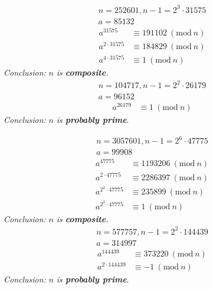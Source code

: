 \documentclass{article}
\newcommand{\Mod}[1]{\ (\mathrm{mod}\ #1)}
\begin{document}
\begin{multicols*}{2}
\begin{multicols*}{2}
\begin{minipage}{\columnwidth}
\begin{align*}
                n = 252601, n-1 = 2^3 \cdot  31575 \\
                a = 85132
            \end{align*}
            \begin{align*}
                a^{31575}         & \equiv 191102 \Mod {n} \\
                a^{2 \cdot 31575} & \equiv 184829 \Mod {n} \\
                a^{4 \cdot 31575} & \equiv 1 \Mod {n}
            \end{align*}
            \textit{Conclusion:} \(n\) \textit{is \textbf{composite}.}
            \begin{align*}
                n = 104717, n-1 = 2^2 \cdot 26179 \\
                a = 96152
            \end{align*}
            \begin{align*}
                a^{26179} & \equiv 1 \Mod {n}
            \end{align*}
            \textit{Conclusion:} \(n\) \textit{is \textbf{probably prime}}.
        \end{minipage}
        \columnbreak
        \begin{minipage}{\columnwidth}
            \begin{align*}
                n = 3057601, n-1 = 2^6 \cdot 47775 \\
                a = 99908
            \end{align*}
            \begin{align*}
                a^{47775}           & \equiv 1193206 \Mod {n} \\
                a^{2 \cdot 47775}   & \equiv 2286397 \Mod {n} \\
                a^{2^2 \cdot 47775} & \equiv 235899 \Mod {n}  \\
                a^{2^3 \cdot 47775} & \equiv 1 \Mod {n}
            \end{align*}
            \textit{Conclusion:} \(n\) \textit{is \textbf{composite}.}
            \begin{align*}
                n = 577757, n-1 = 2^2 \cdot 144439 \\
                a = 314997
            \end{align*}
            \begin{align*}
                a^{144439}         & \equiv 373220 \Mod {n} \\
                a^{2 \cdot 144439} & \equiv -1 \Mod {n}
            \end{align*}
            \textit{Conclusion:} \(n\) \textit{is \textbf{probably prime}}.
        \end{minipage}
    \end{multicols*}

\end{multicols*}
\end{document}
